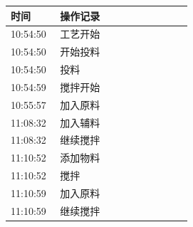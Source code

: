 \documentclass[UTF8,10pt,a4paper,fontset=fandol]{ctexart}
\newcommand{\fieldvalue}[1]{#1}
\begin{document}
\begin{tabular}{p{0.25\linewidth}p{0.67\linewidth}}
\textbf{时间} & \textbf{操作记录} \\ \hline
\fieldvalue{10:54:50} &
\fieldvalue{工艺开始} \\

\fieldvalue{10:54:50} &
\fieldvalue{开始投料} \\

\fieldvalue{10:54:50} &
\fieldvalue{投料} \\

\fieldvalue{10:54:59} &
\fieldvalue{搅拌开始} \\

\fieldvalue{10:55:57} &
\fieldvalue{加入原料} \\

\fieldvalue{11:08:32} &
\fieldvalue{加入辅料} \\

\fieldvalue{11:08:32} &
\fieldvalue{继续搅拌} \\

\fieldvalue{11:10:52} &
\fieldvalue{添加物料} \\

\fieldvalue{11:10:52} &
\fieldvalue{搅拌} \\

\fieldvalue{11:10:59} &
\fieldvalue{加入原料} \\

\fieldvalue{11:10:59} &
\fieldvalue{继续搅拌} \\


\end{tabular}
\end{document}
